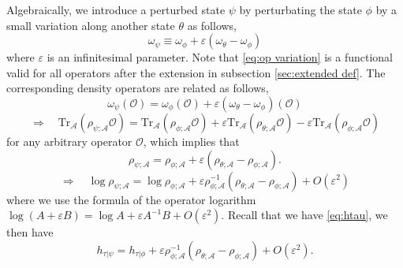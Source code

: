 \documentclass[a4paper,11pt]{article}
\renewcommand{\=}[1]{\stackrel{#1}{=}} %
\def\A{\mathcal{A}}
\def\O{\mathcal{O}}
\def\Tr{\text{Tr}}
\begin{document}
Algebraically, we introduce a perturbed state $\psi$ by perturbating the state $\phi$ by a small variation along another state $\theta$ as follows,
\begin{equation}\label{eq:op variation}
	\omega_\psi\equiv\omega_\phi+\varepsilon(\omega_\theta-\omega_\phi)
\end{equation}
where $\varepsilon$ is an infinitesimal parameter. Note that \eqref{eq:op variation} is a functional valid for all operators after the extension in subsection \ref{sec:extended def}. The corresponding density operators are related as follows,
\begin{equation}\label{eq:op variation2}
	\omega_\psi(\O)=\omega_\phi(\O)+\varepsilon(\omega_\theta-\omega_\phi)(\O)
\end{equation}
\begin{equation}
	\Rightarrow\quad \Tr_{\A}(\rho_{\psi;\A}\O)=\Tr_{\A}(\rho_{\phi;\A}\O)+\varepsilon\Tr_{\A}(\rho_{\theta;\A}\O)-\varepsilon\Tr_{\A}(\rho_{\phi;\A}\O)
\end{equation}
for any arbitrary operator $\O$, which implies that
\begin{equation}\label{eq:density op diff}
	\rho_{\psi;\A}=\rho_{\phi;\A}+\varepsilon(\rho_{\theta;\A}-\rho_{\phi;\A}).
\end{equation}
\begin{equation}
	\Rightarrow\quad \log \rho_{\psi;\A}=\log \rho_{\phi;\A}+\varepsilon \rho_{\phi;\A}^{-1}(\rho_{\theta;\A}-\rho_{\phi;\A})+O(\varepsilon^2)
\end{equation}
where we use the formula of the operator logarithm $\log(A+\varepsilon B)=\log A+\varepsilon A^{-1}B+O(\varepsilon^2)$. Recall that we have \eqref{eq:htau}, we then have
\begin{equation}\label{eq:htau2}
	h_{\tau|\psi}=h_{\tau|\phi}+\varepsilon \rho_{\phi;\A}^{-1}(\rho_{\theta;\A}-\rho_{\phi;\A})+O(\varepsilon^2).
\end{equation}
\end{document}
